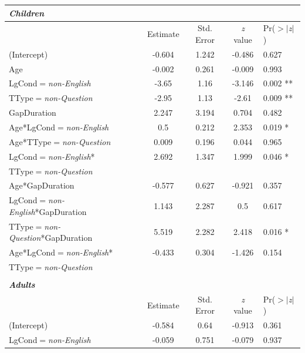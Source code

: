 \documentclass[authoryear, 12pt]{elsarticle}
\begin{document}
\linespread{1}
\begin{table}[h!]
\begin{small}
\begin{center}
  \begin{tabular}{lcccl}
  \textbf{\textit{Children}} &&&& \\
    \hline
			           &  Estimate & Std. Error & \textit{z} value & Pr($>$$|$\textit{z}$|$) \\
    \hline
    (Intercept)   													& -0.604	& 1.242	& -0.486  & 0.627		\\
    Age             												& -0.002	& 0.261	& -0.009  & 0.993		\\
    LgCond$=$\textit{non-English} 						& -3.65		& 1.16	& -3.146  & 0.002 **	\\
    TType$=$\textit{non-Question}      					& -2.95		& 1.13	& -2.61	  & 0.009 **	\\
    GapDuration      											&  2.247	& 3.194	&  0.704  & 0.482		\\
    Age*LgCond$=$\textit{non-English} 					&  0.5		& 0.212	&  2.353  & 0.019 *	\\
    Age*TType$=$\textit{non-Question} 					&  0.009	& 0.196	&  0.044  & 0.965		\\
    LgCond$=$\textit{non-English}*						&  2.692	& 1.347	&  1.999  & 0.046 *	\\
    \hspace*{5mm} TType$=$\textit{non-Question} &&&& \\
    Age*GapDuration												& -0.577	& 0.627	& -0.921  & 0.357		\\
    LgCond$=$\textit{non-English}*GapDuration		&  1.143	& 2.287	&  0.5	  & 0.617		\\
    TType$=$\textit{non-Question}*GapDuration			&  5.519	& 2.282	&  2.418  & 0.016 *	\\
    Age*LgCond$=$\textit{non-English}*					& -0.433	& 0.304	& -1.426  & 0.154		\\
    \hspace*{5mm} TType$=$\textit{non-Question} &&&& \\
    \hline
  &&&& \\
  \textbf{\textit{Adults}} &&&& \\
    \hline
           &  Estimate & Std. Error & \textit{z} value & Pr($>$$|$\textit{z}$|$) \\
    \hline
    (Intercept)														& -0.584   & 0.64  & -0.913 & 0.361			\\
    LgCond$=$\textit{non-English}							& -0.059   & 0.751 & -0.079 & 0.937			\\

\end{tabular}
\end{center}
\end{small}
\end{table}
\end{document}
